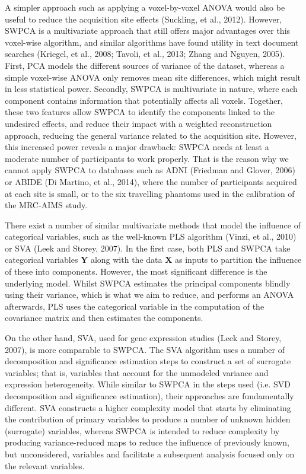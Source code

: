 A simpler approach such as applying a voxel-by-voxel ANOVA would also be
useful to reduce the acquisition site effects (Suckling, et al., 2012).
However, \ac{SWPCA} is a multivariate approach that still offers major
advantages over this voxel-wise algorithm, and similar algorithms have
found utility in text document searches (Kriegel, et al., 2008; Tavoli,
et al., 2013; Zhang and Nguyen, 2005). First, \ac{PCA} models the different
sources of variance of the dataset, whereas a simple voxel-wise \ac{ANOVA}
only removes mean site differences, which might result in less
statistical power. Secondly, \ac{SWPCA} is multivariate in nature, where
each component contains information that potentially affects all
voxels. Together, these two features allow \ac{SWPCA} to identify the
components linked to the undesired effects, and reduce their impact
with a weighted reconstruction approach, reducing the general variance
related to the acquisition site. However, this increased power reveals
a major drawback: \ac{SWPCA} needs at least a moderate number of
participants to work properly. That is the reason why we cannot apply
\ac{SWPCA} to databases such as ADNI (Friedman and Glover, 2006) or ABIDE
(Di Martino, et al., 2014), where the number of participants acquired
at each site is small, or to the six travelling phantoms used in the
calibration of the \ac{MRC-AIMS} study. 


There exist a number of similar multivariate methods that model the
influence of categorical variables, such as the well-known \acf{PLS} algorithm (Vinzi, et al., 2010) or \acf{SVA} (Leek and Storey, 2007). In the first case,
both \ac{PLS} and \ac{SWPCA} take categorical variables \textbf{Y} along with the
data \textbf{X} as inputs to partition the influence of these into
components. However, the most significant difference is the underlying
model. Whilst \ac{SWPCA} estimates the principal components blindly using
their variance, which is what we aim to reduce, and performs an \ac{ANOVA}
afterwards, \ac{PLS} uses the categorical variable in the computation of the
covariance matrix and then estimates the components. 


On the other hand, \ac{SVA}, used for gene expression studies (Leek and
Storey, 2007), is more comparable to \ac{SWPCA}. The \ac{SVA} algorithm uses a
number of decomposition and significance estimation steps to construct
a set of surrogate variables; that is, variables that account for the
unmodeled variance and expression heterogeneity. While similar to \ac{SWPCA}
in the steps used (i.e. \ac{SVD} decomposition and significance estimation),
their approaches are fundamentally different. \ac{SVA} constructs a higher
complexity model that starts by eliminating the contribution of primary
variables to produce a number of unknown hidden (surrogate) variables,
whereas \ac{SWPCA} is intended to reduce complexity by producing
variance-reduced maps to reduce the influence of previously known, but
unconsidered, variables and facilitate a subsequent analysis focused
only on the relevant variables.



